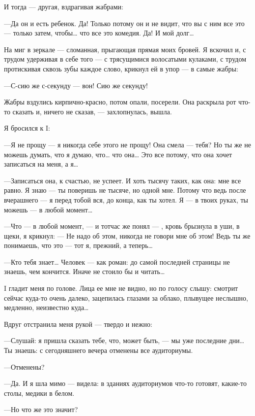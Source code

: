 \documentclass[11pt,openany]{book}
\begin{document}
И тогда --- другая, вздрагивая жабрами:

---Да он и есть ребенок. Да! Только потому он и не видит, что вы с ним все это --- только затем, чтобы\ldots{} что все это комедия. Да! И мой долг\ldots{}

На миг в зеркале --- сломанная, прыгающая прямая моих бровей. Я вскочил и, с трудом удерживая в себе того --- с трясущимися волосатыми кулаками, с трудом протискивая сквозь зубы каждое слово, крикнул ей в упор --- в самые жабры:

---С-сию же с-секунду --- вон! Сию же секунду!

Жабры вздулись кирпично-красно, потом опали, посерели. Она раскрыла рот что-то сказать и, ничего не сказав, --- захлопнулась, вышла.

Я бросился к I:

---Я не прощу --- я никогда себе этого не прощу! Она смела --- тебя? Но ты же не можешь думать, что я думаю, что\ldots{} что она\ldots{} Это все потому, что она хочет записаться на меня, а я\ldots{}

---Записаться она, к счастью, не успеет. И хоть тысячу таких, как она: мне все равно. Я знаю --- ты поверишь не тысяче, но одной мне. Потому что ведь после вчерашнего --- я перед тобой вся, до конца, как ты хотел. Я --- в твоих руках, ты можешь --- в любой момент\ldots{}

---Что --- в любой момент, --- и тотчас же понял --- , кровь брызнула в уши, в щеки, я крикнул: --- Не надо об этом, никогда не говори мне об этом! Ведь ты же понимаешь, что это --- тот я, прежний, а теперь\ldots{}

---Кто тебя знает\ldots{} Человек --- как роман: до самой последней страницы не знаешь, чем кончится. Иначе не стоило бы и читать\ldots{}

I гладит меня по голове. Лица ее мне не видно, но по голосу слышу: смотрит сейчас куда-то очень далеко, зацепилась глазами за облако, плывущее неслышно, медленно, неизвестно куда\ldots{}

Вдруг отстранила меня рукой --- твердо и нежно:

---Слушай: я пришла сказать тебе, что, может быть, --- мы уже последние дни\ldots{} Ты знаешь: с сегодняшнего вечера отменены все аудиториумы.

---Отменены?

---Да. И я шла мимо --- видела: в зданиях аудиториумов что-то готовят, какие-то столы, медики в белом.

---Но что же это значит?
\end{document}
